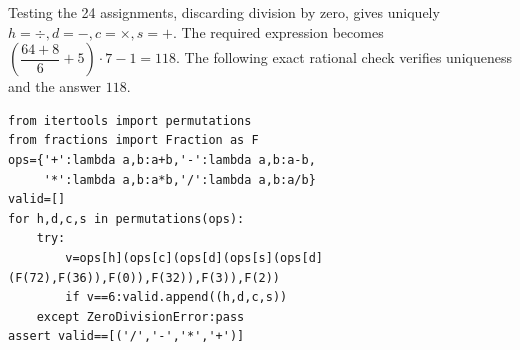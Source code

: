 Testing the 24 assignments, discarding division by zero, gives uniquely $h=\div,d=-,c=\times,s=+$. The required expression becomes $\left(\dfrac{64+8}{6}+5\right)\cdot7-1=118$. The following exact rational check verifies uniqueness and the answer $\boxed{118}$.
\begin{verbatim}
from itertools import permutations
from fractions import Fraction as F
ops={'+':lambda a,b:a+b,'-':lambda a,b:a-b,
     '*':lambda a,b:a*b,'/':lambda a,b:a/b}
valid=[]
for h,d,c,s in permutations(ops):
    try:
        v=ops[h](ops[c](ops[d](ops[s](ops[d](F(72),F(36)),F(0)),F(32)),F(3)),F(2))
        if v==6:valid.append((h,d,c,s))
    except ZeroDivisionError:pass
assert valid==[('/','-','*','+')]
\end{verbatim}
